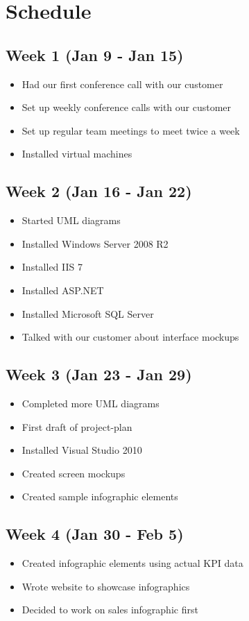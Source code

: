 \documentclass[11pt,a4paper,oneside]{article}
\begin{document}
\section{Schedule}

\subsection{Week 1 (Jan 9 - Jan 15)}
\begin{itemize}
\item Had our first conference call with our customer
\item Set up weekly conference calls with our customer
\item Set up regular team meetings to meet twice a week
\item Installed virtual machines
\end{itemize}


\subsection{Week 2 (Jan 16 - Jan 22)}
\begin{itemize}
\item Started UML diagrams
\item Installed Windows Server 2008 R2
\item Installed IIS 7
\item Installed ASP.NET
\item Installed Microsoft SQL Server
\item Talked with our customer about interface mockups
\end{itemize}

\subsection{Week 3 (Jan 23 - Jan 29)}
\begin{itemize}
\item Completed more UML diagrams
\item First draft of project-plan
\item Installed Visual Studio 2010
\item Created screen mockups
\item Created sample infographic elements
\end{itemize}

\subsection{Week 4 (Jan 30 - Feb 5)}
\begin{itemize}
\item Created infographic elements using actual KPI data
\item Wrote website to showcase infographics
\item Decided to work on sales infographic first
\end{itemize}
\end{document}

